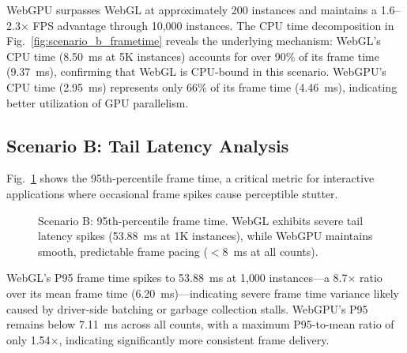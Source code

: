 \documentclass[conference]{IEEEtran}
\begin{document}
WebGPU surpasses WebGL at approximately 200 instances and maintains a 1.6--2.3$\times$ FPS advantage through 10{,}000 instances. The CPU time decomposition in Fig.~\ref{fig:scenario_b_frametime} reveals the underlying mechanism: WebGL's CPU time (8.50~ms at 5K instances) accounts for over 90\% of its frame time (9.37~ms), confirming that WebGL is CPU-bound in this scenario. WebGPU's CPU time (2.95~ms) represents only 66\% of its frame time (4.46~ms), indicating better utilization of GPU parallelism.

\subsection{Scenario B: Tail Latency Analysis}

Fig.~\ref{fig:scenario_b_p95} shows the 95th-percentile frame time, a critical metric for interactive applications where occasional frame spikes cause perceptible stutter.

\begin{figure}[htbp]
\centering
{}
\caption{Scenario B: 95th-percentile frame time. WebGL exhibits severe tail latency spikes (53.88~ms at 1K instances), while WebGPU maintains smooth, predictable frame pacing ($<$8~ms at all counts).}
\label{fig:scenario_b_p95}
\end{figure}

WebGL's P95 frame time spikes to 53.88~ms at 1{,}000 instances---a 8.7$\times$ ratio over its mean frame time (6.20~ms)---indicating severe frame time variance likely caused by driver-side batching or garbage collection stalls. WebGPU's P95 remains below 7.11~ms across all counts, with a maximum P95-to-mean ratio of only 1.54$\times$, indicating significantly more consistent frame delivery.
\end{document}

